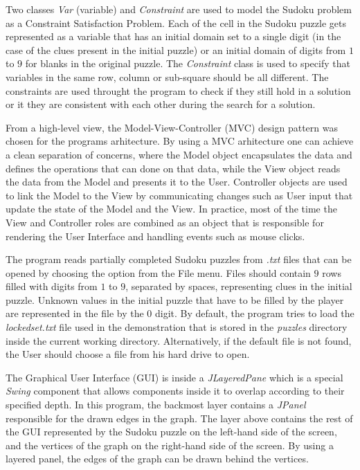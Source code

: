 \documentclass{l4proj}
\begin{document}
\noindent Two classes \textit{Var} (variable) and \textit{Constraint} are used to model the Sudoku problem as a Constraint Satisfaction Problem. Each of the cell in the Sudoku puzzle gets represented as a variable that has an initial domain set to a single digit (in the case of the clues present in the initial puzzle) or an initial domain of digits from $1$ to $9$ for blanks in the original puzzle. The \textit{Constraint} class is used to specify that variables in the same row, column or sub-square should be all different. The constraints are used throught the program to check if they still hold in a solution or it they are consistent with each other during the search for a solution.

\noindent From a high-level view, the Model-View-Controller (MVC) design pattern was chosen for the program\textquotesingle s arhitecture. By using a MVC arhitecture one can achieve a clean separation of concerns, where the Model object encapsulates the data and defines the operations that can done on that data, while the View object reads the data from the Model and presents it to the User. Controller objects are used to link the Model to the View by communicating changes such as User input that update the state of the Model and the View. In practice, most of the time the View and Controller roles are combined as an object that is responsible for rendering the User Interface and handling events such as mouse clicks.

\noindent The program reads partially completed Sudoku puzzles from \textit{.txt} files that can be opened by choosing the option from the File menu. Files should contain $9$ rows filled with digits from $1$ to $9$, separated by spaces, representing clues in the initial puzzle. Unknown values in the initial puzzle that have to be filled by the player are represented in the file by the $0$ digit. By default, the program tries to load the \textit{lockedset.txt} file used in the demonstration that is stored in the \textit{puzzles} directory inside the current working directory. Alternatively, if the default file is not found, the User should choose a file from his hard drive to open.

\noindent The Graphical User Interface (GUI) is inside a \textit{JLayeredPane} which is a special \textit{Swing} component that allows components inside it to overlap according to their specified depth. In this program, the backmost layer contains a \textit{JPanel} responsible for the drawn edges in the graph. The layer above contains the rest of the GUI represented by the Sudoku puzzle on the left-hand side of the screen, and the vertices of the graph on the right-hand side of the screen. By using a layered panel, the edges of the graph can be drawn behind the vertices.
\end{document}
